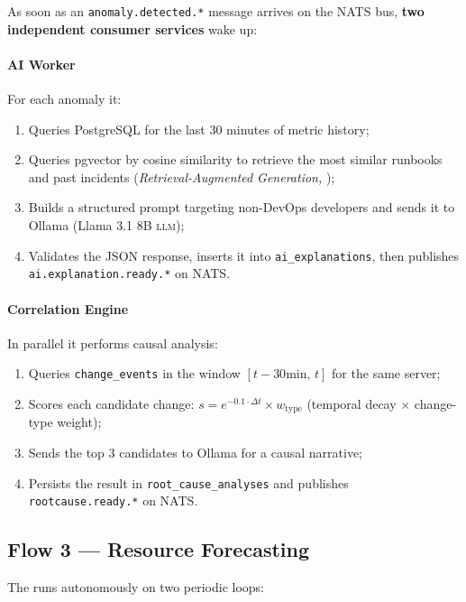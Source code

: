 As soon as an \texttt{anomaly.detected.*} message arrives on the NATS bus,
\textbf{two independent consumer services} wake up:

\paragraph{AI Worker} For each anomaly it:
\begin{enumerate}
  \item Queries PostgreSQL for the last 30 minutes of metric history;
  \item Queries pgvector by cosine similarity to retrieve the most similar
        runbooks and past incidents (\textit{Retrieval-Augmented Generation, \rag{}});
  \item Builds a structured prompt targeting non-DevOps developers and sends
        it to Ollama (Llama 3.1 8B \textsc{llm});
  \item Validates the JSON response, inserts it into \texttt{ai\_explanations},
        then publishes \texttt{ai.explanation.ready.*} on NATS.
\end{enumerate}

\paragraph{Correlation Engine} In parallel it performs causal analysis:
\begin{enumerate}
  \item Queries \texttt{change\_events} in the window $[t-30\text{min},\,t]$
        for the same server;
  \item Scores each candidate change:
        $s = e^{-0.1 \cdot \Delta t} \times w_{\text{type}}$
        (temporal decay $\times$ change-type weight);
  \item Sends the top 3 candidates to Ollama for a causal narrative;
  \item Persists the result in \texttt{root\_cause\_analyses} and publishes
        \texttt{rootcause.ready.*} on NATS.
\end{enumerate}

\subsection{Flow 3 — Resource Forecasting}

The  runs autonomously on two periodic loops:

